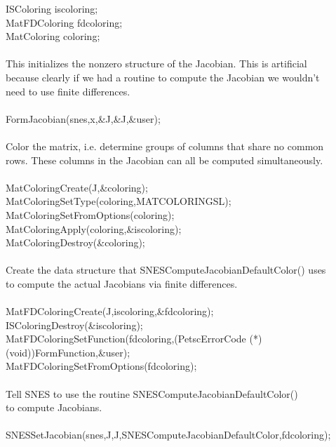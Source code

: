 \begin{tabbing}
   ISColoring    iscoloring;\\
   MatFDColoring fdcoloring;\\
   MatColoring   coloring;\\

   \trl{/*}\\
      This initializes the nonzero structure of the Jacobian. This is artificial\\
      because clearly if we had a routine to compute the Jacobian we wouldn't\\
      need to use finite differences.\\
   \trl{*/}\\
   FormJacobian(snes,x,\&J,\&J,\&user);\\

   \trl{/*}\\
       Color the matrix, i.e. determine groups of columns that share no common \\
      rows. These columns in the Jacobian can all be computed simultaneously.\\
   \trl{*/}\\
   MatColoringCreate(J,\&coloring);\\
   MatColoringSetType(coloring,MATCOLORINGSL);\\
   MatColoringSetFromOptions(coloring);\\
   MatColoringApply(coloring,\&iscoloring);\\
   MatColoringDestroy(\&coloring);\\
   \trl{/*}\\
       Create the data structure that SNESComputeJacobianDefaultColor() uses\\
       to compute the actual Jacobians via finite differences.\\
   \trl{*/}\\
   MatFDColoringCreate(J,iscoloring,\&fdcoloring);\\
   ISColoringDestroy(\&iscoloring);\\
   MatFDColoringSetFunction(fdcoloring,(PetscErrorCode (*)(void))FormFunction,\&user);\\
   MatFDColoringSetFromOptions(fdcoloring);\\

   \trl{/*}\\
      Tell SNES to use the routine SNESComputeJacobianDefaultColor()\\
      to compute Jacobians.\\
   \trl{*/}\\
   SNESSetJacobian(snes,J,J,SNESComputeJacobianDefaultColor,fdcoloring);\\

\end{tabbing}

